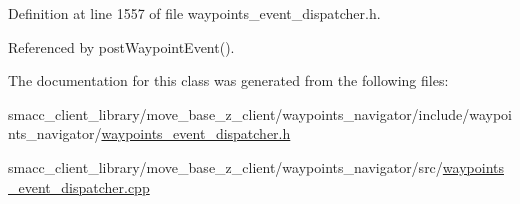 Definition at line 1557 of file waypoints\+\_\+event\+\_\+dispatcher.\+h.



Referenced by post\+Waypoint\+Event().



The documentation for this class was generated from the following files\+:\begin{DoxyCompactItemize}
\item 
smacc\+\_\+client\+\_\+library/move\+\_\+base\+\_\+z\+\_\+client/waypoints\+\_\+navigator/include/waypoints\+\_\+navigator/\hyperlink{waypoints__event__dispatcher_8h}{waypoints\+\_\+event\+\_\+dispatcher.\+h}\item 
smacc\+\_\+client\+\_\+library/move\+\_\+base\+\_\+z\+\_\+client/waypoints\+\_\+navigator/src/\hyperlink{waypoints__event__dispatcher_8cpp}{waypoints\+\_\+event\+\_\+dispatcher.\+cpp}\end{DoxyCompactItemize}
